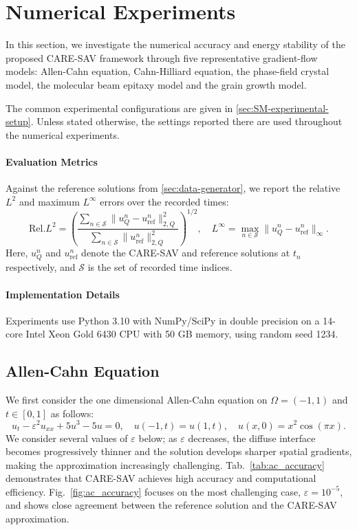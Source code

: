 \documentclass[10pt,reqno]{amsart}
\theoremstyle{remark}
\theoremstyle{definition}
\let\originalparagraph\paragraph
\renewcommand{\paragraph}[1]{\originalparagraph{\textbf{#1}}}
\begin{document}
\section{Numerical Experiments}
In this section, we investigate the numerical accuracy and energy stability of the proposed CARE-SAV framework through five representative gradient-flow models: Allen-Cahn equation, Cahn-Hilliard equation, the phase-field crystal model, the molecular beam epitaxy model and the grain growth model.

The common experimental configurations are given in \cref{sec:SM-experimental-setup}. Unless stated otherwise, the settings reported there are used throughout the numerical experiments.

\paragraph{Evaluation Metrics}
Against the reference solutions from \cref{sec:data-generator}, we report the relative $L^2$ and maximum $L^\infty$ errors over the recorded times:
\begin{equation}
  \mathrm{Rel.}L^2 = \left(\frac{\sum_{n\in\mathcal{S}}\|u_Q^n-u_{\mathrm{ref}}^n\|_{2,Q}^{2}}{\sum_{n\in\mathcal{S}}\|u_{\mathrm{ref}}^n\|_{2,Q}^{2}}\right)^{1/2}, \quad
  L^\infty=\max_{n\in\mathcal{S}}\|u_Q^n-u_{\mathrm{ref}}^n\|_{\infty}.
\end{equation}
Here, $u_Q^n$ and $u_{\mathrm{ref}}^n$ denote the CARE-SAV and reference solutions at $t_n$ respectively, and $\mathcal{S}$ is the set of recorded time indices.

\paragraph{Implementation Details}
Experiments use Python 3.10 with NumPy/SciPy in double precision on a 14-core Intel Xeon Gold 6430 CPU with 50 GB memory, using random seed 1234.

\subsection{Allen-Cahn Equation}
We first consider the one dimensional Allen-Cahn equation on $\Omega = (-1,1)$ and $t\in[0,1]$ as follows:
\begin{equation}
  u_t-\varepsilon^2u_{xx}+5u^3-5u=0,\quad u(-1,t)=u(1,t),\quad u(x,0)=x^2\cos(\pi x).
\end{equation}
We consider several values of $\varepsilon$ below; as $\varepsilon$ decreases, the diffuse interface becomes progressively thinner and the solution develops sharper spatial gradients, making the approximation increasingly challenging. Tab.~\ref{tab:ac_accuracy} demonstrates that CARE-SAV achieves high accuracy and computational efficiency. Fig.~\ref{fig:ac_accuracy} focuses on the most challenging case, $\varepsilon=10^{-5}$, and shows close agreement between the reference solution and the CARE-SAV approximation.
\end{document}
